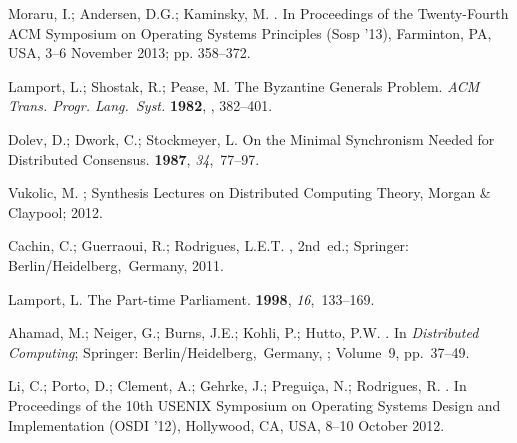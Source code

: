 \documentclass[algorithms,article,accept,moreauthors,pdftex,10pt,a4paper]{Definitions/mdpi}
\begin{document}
\begin{thebibliography}{999}
Moraru, I.; Andersen, D.G.; Kaminsky, M.
.
\newblock In Proceedings of the Twenty-Fourth ACM Symposium on Operating Systems Principles (Sosp '13), Farminton, PA, USA, 3--6 November 2013;  pp. 358--372.

Lamport, L.; Shostak, R.; Pease, M.
\newblock The {Byzantine} Generals Problem. \emph{ACM Trans. Progr. Lang.~Syst.} {\bf 1982},
, 382--401.

Dolev, D.; Dwork, C.; Stockmeyer, L.
\newblock On the Minimal Synchronism Needed for Distributed Consensus.
 {\bf 1987}, {\em 34},~77--97.

Vukolic, M.
;
Synthesis Lectures on Distributed Computing Theory, Morgan {\&} Claypool;
{2012}.%

Cachin, C.; Guerraoui, R.; Rodrigues, L.E.T.
, 2nd~ed.; Springer: {\mbox{Berlin/Heidelberg, Germany}}, 2011.

{Lamport, L.} %
\newblock The Part-time Parliament.
 {\bf 1998}, {\em 16},~133--169.

Ahamad, M.; Neiger, G.; Burns, J.E.; Kohli, P.; Hutto, P.W.
. {In \emph{Distributed Computing}; Springer: \mbox{Berlin/Heidelberg, Germany}}, 
; Volume~9, pp.~37--49.

Li, C.; Porto, D.; Clement, A.; Gehrke, J.; Pregui{\c{c}}a, N.; Rodrigues, R.
.
\newblock In Proceedings of the 10th USENIX Symposium on Operating Systems Design and Implementation (OSDI ’12), Hollywood, CA, USA, 8--10 October 2012.

\end{thebibliography}
\end{document}
